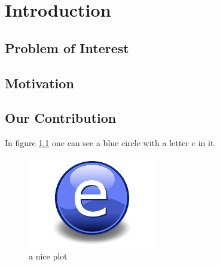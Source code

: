 \chapter{Introduction} %
\label{Chapter1}
\section {Problem of Interest}
\section {Motivation}
\section {Our Contribution}
In figure \ref{fig:mesh1} one can see a blue circle with a letter $e$ in it.
\begin{figure}
 \centering
   \includegraphics[width=0.5\textwidth]{Figures/Electron.pdf}
    \caption{a nice plot}
    \label{fig:mesh1}
\end{figure}
